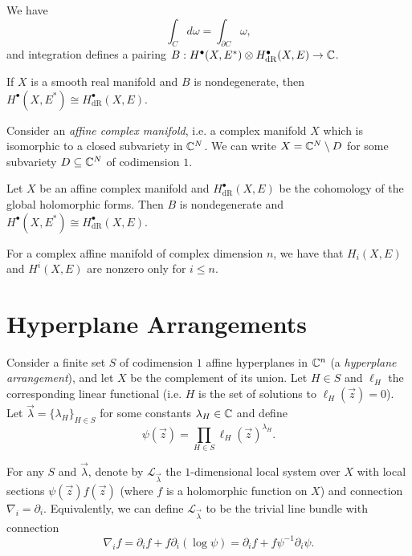 \begin{theorem}
  We have
  \[
    \int_C d\omega = \int_{\partial C} \omega,
  \]
  and integration defines a pairing
  $B : H^\bullet(X, E^*) \otimes H^\bullet_{\mathrm{dR}}(X, E) \to \mathbb{C}$.
\end{theorem}

\begin{theorem}
  If $X$ is a smooth real manifold and
  $B$ is nondegenerate, then
  $H^\bullet(X, E^*) \cong H^\bullet_{\mathrm{dR}}(X, E)$.
\end{theorem}


\begin{remark}
  Consider an \emph{affine complex manifold},
  i.e. a complex manifold $X$ which is
  isomorphic to a closed subvariety
  in $\mathbb{C}^N$. We can
  write $X = \mathbb{C}^N \setminus D$ for
  some subvariety $D \subseteq \mathbb{C}^N$ of
  codimension $1$.
\end{remark}

\begin{theorem}
  Let $X$ be an affine complex manifold
  and $H^{\bullet}_{\mathrm{dR}}(X, E)$ be the
  cohomology of the global holomorphic
  forms. Then $B$ is nondegenerate and
  $H^\bullet(X, E^*) \cong H^\bullet_{\mathrm{dR}}(X, E)$.
\end{theorem}

\begin{corollary}
  For a complex affine manifold of
  complex dimension $n$, we have that
  $H_i(X, E)$ and $H^i(X, E)$
  are nonzero only for $i \le n$.
\end{corollary}

\section{Hyperplane Arrangements}

\begin{remark}
  Consider a finite set $S$ of codimension
  $1$ affine hyperplanes
  in $\mathbb{C}^n$ (a \emph{hyperplane arrangement}), and let $X$ be the complement
  of its union. Let $H \in S$ and
  $\ell_H$ the corresponding linear
  functional (i.e. $H$ is the set of
  solutions to $\ell_H(\vec{z}) = 0$).
  Let $\vec{\lambda} = \{\lambda_H\}_{H \in S}$
  for some constants $\lambda_H \in \mathbb{C}$
  and define
  \[
    \psi(\vec{z})
    = \prod_{H \in S} \ell_H(\vec{z})^{\lambda_H}.
  \]
\end{remark}

\begin{definition}
  For any $S$ and $\vec{\lambda}$,
  denote by $\mathcal{L}_{\vec{\lambda}}$ the
  $1$-dimensional local system
  over $X$ with local sections
  $\psi(\vec{z}) f(\vec{z})$
  (where $f$ is a holomorphic function on
  $X$) and connection
  $\nabla_i = \partial_i$. Equivalently,
  we can define $\mathcal{L}_{\vec{\lambda}}$
  to be the trivial line bundle with
  connection
  \[
    \nabla_i f
    = \partial_i f + f \partial_i(\log \psi)
    = \partial_i f + f \psi^{-1} \partial_i \psi.
  \]
\end{definition}

